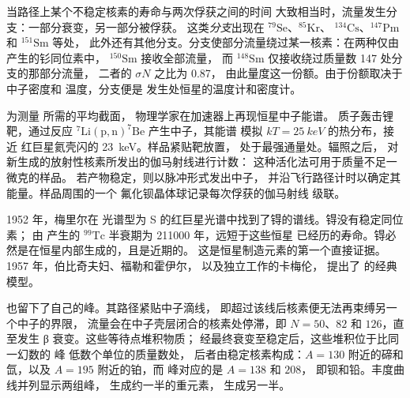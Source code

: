 当路径上某个不稳定核素的寿命与两次俘获之间的时间
大致相当时，流量发生分支：一部分衰变，另一部分被俘获。
这类\emph{分支}出现在 $^{79}\mathrm{Se}$、$^{85}\mathrm{Kr}$、
$^{134}\mathrm{Cs}$、$^{147}\mathrm{Pm}$ 和 $^{151}\mathrm{Sm}$ 等处，
此外还有其他分支。分支使部分流量绕过某一核素：在两种仅由 产生的钐同位素中，
$^{150}\mathrm{Sm}$ 接收全部流量，
而 $^{148}\mathrm{Sm}$ 仅接收绕过质量数 147 处分支的那部分流量，
二者的 $\sigma N$ 之比为 \num{0.87}，
由此量度这一份额。由于份额取决于中子密度和
温度，分支便是
发生处恒星的温度计和密度计。

\begin{inthelab}[测量俘获截面]
为测量 所需的平均截面，
物理学家在加速器上再现恒星中子能谱。
质子轰击锂靶，通过反应
$^{7}\mathrm{Li}(\mathrm{p},\mathrm{n})^{7}\mathrm{Be}$ 产生中子，其能谱
模拟 $kT = \qty{25}{keV}$ 的热分布，接近
红巨星氦壳闪的 \qty{23}{keV}。样品紧贴靶放置，
处于最强通量处。辐照之后，
对新生成的放射性核素所发出的伽马射线进行计数：
这种活化法可用于质量不足一微克的样品。
若产物稳定，则以脉冲形式发出中子，
并沿飞行路径计时以确定其能量。样品周围的一个
氟化钡晶体球记录每次俘获的伽马射线
级联。
\end{inthelab}

\begin{history}[红巨星中的锝]
1952 年，梅里尔在
光谱型为 S 的红巨星光谱中找到了锝的谱线。锝没有稳定同位素；
由 产生的 $^{99}\mathrm{Tc}$ 半衰期为
\num{211000} 年，远短于这些恒星
已经历的寿命。锝必然是在恒星内部生成的，且是近期的。
这是恒星制造元素的第一个直接证据。
1957 年，伯比奇夫妇、福勒和霍伊尔，
以及独立工作的卡梅伦，
提出了 的经典模型。
\end{history}

也留下了自己的峰。其路径紧贴中子滴线，
即超过该线后核素便无法再束缚另一个中子的界限，
流量会在中子壳层闭合的核素处停滞，即 $N = 50$、$82$ 和
$126$，直至发生 β 衰变。这些等待点堆积物质；
经最终衰变至稳定后，这些堆积位于比同一幻数的 峰
低数个单位的质量数处，
后者由稳定核素构成：$A = 130$ 附近的碲和氙，以及
$A = 195$ 附近的铂，而 峰对应的是 $A = 138$ 和 $208$，
即钡和铅。丰度曲线并列显示两组峰，
生成约一半的重元素，
生成另一半。

